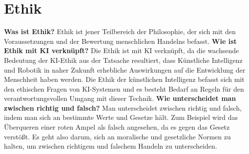 \section{Ethik}
\label{sec:ethic}
\textbf{Was ist Ethik?}\newline
Ethik ist jener Teilbereich der Philosophie, der sich mit den Voraussetzungen und der Bewertung menschlichen Handelns befasst.\newline
\textbf{Wie ist Ethik mit KI verknüpft?}\newline
Die Ethik ist mit KI verknüpft, da die wachsende Bedeutung der KI-Ethik aus der Tatsache resultiert, dass Künstliche Intelligenz und Robotik in naher Zukunft erhebliche Auswirkungen auf die Entwicklung der Menschheit haben werden. Die Ethik der künstlichen Intelligenz befasst sich mit den ethischen Fragen von KI-Systemen und es besteht Bedarf an Regeln für den verantwortungsvollen Umgang mit dieser Technik.\newline
\textbf{Wie unterscheidet man zwischen richtig und falsch?}\newline
Man unterscheidet zwischen richtig und falsch, indem man sich an bestimmte Werte und Gesetze hält. Zum Beispiel wird das Überqueren einer roten Ampel als falsch angesehen, da es gegen das Gesetz verstößt. Es geht also darum, sich an moralische und gesetzliche Normen zu halten, um zwischen richtigem und falschem Handeln zu unterscheiden.\newline